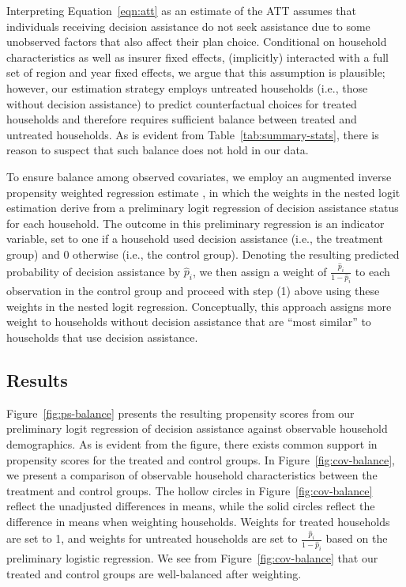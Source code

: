 \documentclass[12pt]{article}
\begin{document}
Interpreting Equation~\eqref{eqn:att} as an estimate of the ATT assumes that individuals receiving decision assistance do not seek assistance due to some unobserved factors that also affect their plan choice. Conditional on household characteristics as well as insurer fixed effects, (implicitly) interacted with a full set of region and year fixed effects, we argue that this assumption is plausible; however, our estimation strategy employs untreated households (i.e., those without decision assistance) to predict counterfactual choices for treated households and therefore requires sufficient balance between treated and untreated households. As is evident from Table~\ref{tab:summary-stats}, there is reason to suspect that such balance does not hold in our data.

To ensure balance among observed covariates, we employ an augmented inverse propensity weighted regression estimate \cite{wooldridge2010}, in which the weights in the nested logit estimation derive from a preliminary logit regression of decision assistance status for each household. The outcome in this preliminary regression is an indicator variable, set to one if a household used decision assistance (i.e., the treatment group) and 0 otherwise (i.e., the control group). Denoting the resulting predicted probability of decision assistance by $\hat{p}_{i}$, we then assign a weight of $\frac{\hat{p}_{i}}{1-\hat{p}_{i}}$ to each observation in the control group and proceed with step (1) above using these weights in the nested logit regression. Conceptually, this approach assigns more weight to households without decision assistance that are ``most similar'' to households that use decision assistance.


\subsection{Results}
\label{subsec:causal-results}

Figure~\ref{fig:ps-balance} presents the resulting propensity scores from our preliminary logit regression of decision assistance against observable household demographics. As is evident from the figure, there exists common support in propensity scores for the treated and control groups. In Figure~\ref{fig:cov-balance}, we present a comparison of observable household characteristics between the treatment and control groups. The hollow circles in Figure~\ref{fig:cov-balance} reflect the unadjusted differences in means, while the solid circles reflect the difference in means when weighting households. Weights for treated households are set to 1, and weights for untreated households are set to  $\frac{\hat{p}_{i}}{1-\hat{p}_{i}}$ based on the preliminary logistic regression. We see from Figure~\ref{fig:cov-balance} that our treated and control groups are well-balanced after weighting.
\end{document}
